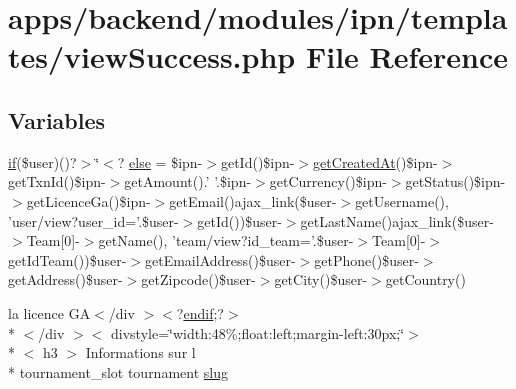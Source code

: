 \hypertarget{backend_2modules_2ipn_2templates_2view_success_8php}{\section{apps/backend/modules/ipn/templates/view\-Success.php File Reference}
\label{backend_2modules_2ipn_2templates_2view_success_8php}
}
\subsection*{Variables}
\begin{DoxyCompactItemize}
\item 
\hyperlink{live_2modules_2tournament_2templates_2__form_team_8php_ae30a307b320d8da5d9a945eaf68f7549}{if}(\$user)()?$>$\char`\"{}$<$? \hyperlink{backend_2modules_2ipn_2templates_2view_success_8php_a922492e78a18c50308febb5901b37559}{else} = \$ipn-\/$>$get\-Id()\$ipn-\/$>$\hyperlink{live_2modules_2news_2templates_2view_success_8php_a684dd27287fcedcbe91ff8c7cc23f3bb}{get\-Created\-At}()\$ipn-\/$>$get\-Txn\-Id()\$ipn-\/$>$get\-Amount().' '.\$ipn-\/$>$get\-Currency()\$ipn-\/$>$get\-Status()\$ipn-\/$>$get\-Licence\-Ga()\$ipn-\/$>$get\-Email()ajax\-\_\-link(\$user-\/$>$get\-Username(), 'user/view?user\-\_\-id='.\$user-\/$>$get\-Id())\$user-\/$>$get\-Last\-Name()ajax\-\_\-link(\$user-\/$>$Team\mbox{[}0\mbox{]}-\/$>$get\-Name(), 'team/view?id\-\_\-team='.\$user-\/$>$Team\mbox{[}0\mbox{]}-\/$>$get\-Id\-Team())\$user-\/$>$get\-Email\-Address()\$user-\/$>$get\-Phone()\$user-\/$>$get\-Address()\$user-\/$>$get\-Zipcode()\$user-\/$>$get\-City()\$user-\/$>$get\-Country()
\item 
la licence G\-A$<$/div $>$$<$?\hyperlink{live_2templates_2layout_8php_a82cd33ca97ff99f2fcc5e9c81d65251b}{endif};?$>$\\*
$<$/div $>$$<$ divstyle=\char`\"{}width\-:48\%;float\-:left;margin-\/left\-:30px;\char`\"{}$>$\\*
$<$ h3 $>$ Informations sur l \\*
tournament\-\_\-slot tournament \hyperlink{backend_2modules_2ipn_2templates_2view_success_8php_a2b7d6694be020169de3a660b1b93a40d}{slug}
\end{DoxyCompactItemize}


